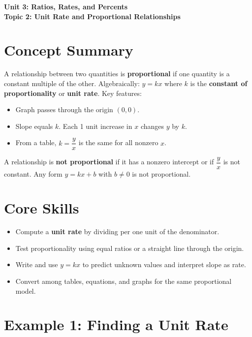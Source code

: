 \documentclass[12pt]{article}
\begin{document}
\begin{center}
    \LARGE \textbf{Unit 3: Ratios, Rates, and Percents} \\[6pt]
    \Large \textbf{Topic 2: Unit Rate and Proportional Relationships}
\end{center}

\vspace{1em}

\section*{Concept Summary}

A relationship between two quantities is \textbf{proportional} if one quantity is a constant multiple of the other.  
Algebraically: \(y = kx\) where \(k\) is the \textbf{constant of proportionality} or \textbf{unit rate}.  
Key features:
\begin{itemize}
  \item Graph passes through the origin \((0,0)\).
  \item Slope equals \(k\). Each 1 unit increase in \(x\) changes \(y\) by \(k\).
  \item From a table, \(k = \dfrac{y}{x}\) is the same for all nonzero \(x\).
\end{itemize}

A relationship is \textbf{not proportional} if it has a nonzero intercept or if \(\dfrac{y}{x}\) is not constant. Any form \(y = kx + b\) with \(b \ne 0\) is not proportional.

\section*{Core Skills}
\begin{itemize}
  \item Compute a \textbf{unit rate} by dividing per one unit of the denominator.
  \item Test proportionality using equal ratios or a straight line through the origin.
  \item Write and use \(y = kx\) to predict unknown values and interpret slope as rate.
  \item Convert among tables, equations, and graphs for the same proportional model.
\end{itemize}

\section*{Example 1: Finding a Unit Rate}
\end{document}
